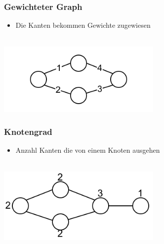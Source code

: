 \begin{minipage}{0.5\textwidth}
\subsubsection*{Gewichteter Graph}
\begin{itemize}[leftmargin=*]
\item Die Kanten bekommen Gewichte zugewiesen
\end{itemize}\
\\
\includegraphics[width=0.6\textwidth]{graphics/graph_gewicht.png}
\end{minipage}
\hfill
\begin{minipage}{0.5\textwidth}
\subsubsection*{Knotengrad}
\begin{itemize}[leftmargin=*]
\item Anzahl Kanten die von einem Knoten ausgehen
\end{itemize}\
\\
\includegraphics[width=0.6\textwidth]{graphics/graph_knotengrad.png}
\end{minipage}

